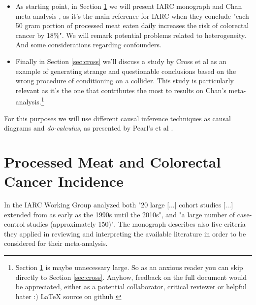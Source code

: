 \documentclass{article}
\begin{document}
\begin{itemize}

\item As starting point, in Section \ref{sec:iarc} we will present IARC monograph and Chan meta-analysis \cite{chan}, as it's the main reference for IARC when they conclude "each 50 gram portion of processed meat eaten daily increases the risk of colorectal cancer by 18\%". We will remark potential problems related to heterogeneity. And some considerations regarding confounders. %
\item Finally in Section \ref{sec:cross} we'll discuss a study by Cross et al \cite{cross} as an example of generating strange and questionable conclusions based on the wrong procedure of conditioning on a collider. This study is particularly relevant as it's the one that contributes the most to results on Chan's meta-analysis.\footnote{%
Section \ref{sec:iarc} is maybe unnecessary large. So as an anxious reader you can skip directly to Section \ref{sec:cross}. Anyhow, feedback on the full document would be appreciated, either as a potential collaborator, critical reviewer or helpful hater :) LaTeX source on github \cite{mygithub}}

\end{itemize}

For this purposes we will use different causal inference techniques as causal diagrams and \textit{do-calculus}, as presented by Pearl's et al \cite{bookofwhy}.

\section{Processed Meat and Colorectal Cancer Incidence}
\label{sec:iarc}

In \cite{monograph} the IARC Working Group analyzed both "20 large [...] cohort studies [...] extended from as early as the 1990s until the 2010s", and "a large number of case-control studies (approximately 150)". The monograph describes also five criteria they applied in reviewing and interpreting the available literature in order to be considered for their meta-analysis. %
\end{document}
